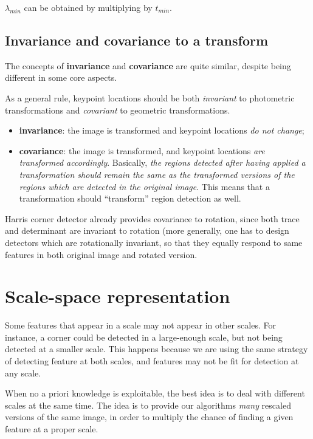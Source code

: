 \documentclass[10pt]{report}
\begin{document}
\(\lambda_{min}\) can be obtained by multiplying by \(t_{min}\).

\subsection{Invariance and covariance to a transform}
\label{invariance-and-covariance-to-a-transform}
The concepts of \textbf{invariance} and \textbf{covariance} are quite similar, despite
being different in some core aspects.

As a general rule, keypoint locations should be both \emph{invariant} to photometric
transformations and \emph{covariant} to geometric transformations.

\begin{itemize}
\item \textbf{invariance}: the image is transformed and keypoint locations \emph{do not
change};
\item \textbf{covariance}: the image is transformed, and keypoint locations \emph{are
transformed accordingly}. Basically, \emph{the regions detected after
having applied a transformation should remain the same as the
transformed versions of the regions which are detected in the original
image}. This means that a transformation should ``transform'' region
detection as well.
\end{itemize}

Harris corner detector already provides covariance to rotation, since
both trace and determinant are invariant to rotation (more generally,
one has to design detectors which are rotationally invariant, so that
they equally respond to same features in both original image and rotated
version.

\section{Scale-space representation}
\label{scale-space-representation}
Some features that appear in a scale may not appear in other scales. For
instance, a corner could be detected in a large-enough scale, but not
being detected at a smaller scale. This happens because we are using the
same strategy of detecting feature at both scales, and features may not
be fit for detection at any scale.

When no a priori knowledge is exploitable, the best idea is to deal with
different scales at the same time. The idea is to provide our algorithms
\emph{many} rescaled versions of the same image, in order to multiply the
chance of finding a given feature at a proper scale.
\end{document}
